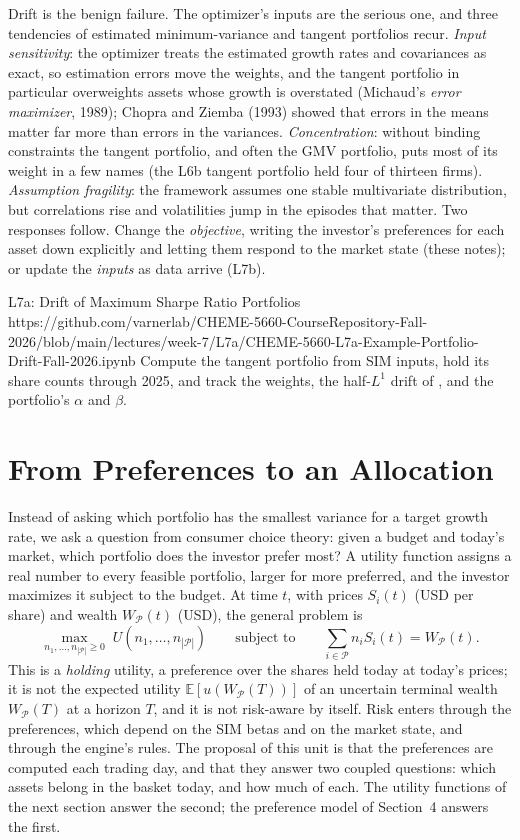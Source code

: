 \documentclass[11pt]{article}
\newcommand{\E}{\mathbb{E}}
\newcommand{\np}{|\mathcal P|}
\newcommand{\WP}{W_{\mathcal P}}
\begin{document}
Drift is the benign failure. The optimizer's inputs are the serious one, and three tendencies of estimated minimum-variance and tangent portfolios recur. \emph{Input sensitivity}: the optimizer treats the estimated growth rates and covariances as exact, so estimation errors move the weights, and the tangent portfolio in particular overweights assets whose growth is overstated (Michaud's \emph{error maximizer}, 1989); Chopra and Ziemba (1993) showed that errors in the means matter far more than errors in the variances. \emph{Concentration}: without binding constraints the tangent portfolio, and often the GMV portfolio, puts most of its weight in a few names (the L6b tangent portfolio held four of thirteen firms). \emph{Assumption fragility}: the framework assumes one stable multivariate distribution, but correlations rise and volatilities jump in the episodes that matter. Two responses follow. Change the \emph{objective}, writing the investor's preferences for each asset down explicitly and letting them respond to the market state (these notes); or update the \emph{inputs} as data arrive (L7b).

\notebooklink
  {L7a: Drift of Maximum Sharpe Ratio Portfolios}
  {https://github.com/varnerlab/CHEME-5660-CourseRepository-Fall-2026/blob/main/lectures/week-7/L7a/CHEME-5660-L7a-Example-Portfolio-Drift-Fall-2026.ipynb}
  {Compute the tangent portfolio from SIM inputs, hold its share counts through 2025, and track the weights, the half-$L^1$ drift of , and the portfolio's $\alpha$ and $\beta$.}

\section{From Preferences to an Allocation}

Instead of asking which portfolio has the smallest variance for a target growth rate, we ask a question from consumer choice theory: given a budget and today's market, which portfolio does the investor prefer most? A utility function assigns a real number to every feasible portfolio, larger for more preferred, and the investor maximizes it subject to the budget. At time $t$, with prices $S_i(t)$ (USD per share) and wealth $\WP(t)$ (USD), the general problem is
\begin{equation}
  \label{eq:utility-problem}
  \max_{n_1,\ldots,n_{\np}\ge0}\;U(n_1,\ldots,n_{\np})
  \qquad\text{subject to}\qquad
  \sum_{i\in\mathcal P}n_iS_i(t)=\WP(t).
\end{equation}
This is a \emph{holding} utility, a preference over the shares held today at today's prices; it is not the expected utility $\E[u(\WP(T))]$ of an uncertain terminal wealth $\WP(T)$ at a horizon $T$, and it is not risk-aware by itself. Risk enters through the preferences, which depend on the SIM betas and on the market state, and through the engine's rules. The proposal of this unit is that the preferences are computed each trading day, and that they answer two coupled questions: which assets belong in the basket today, and how much of each. The utility functions of the next section answer the second; the preference model of Section~4 answers the first.
\end{document}
